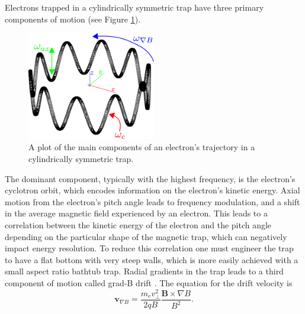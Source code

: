 Electrons trapped in a cylindrically symmetric trap have three primary components of motion (see Figure \ref{fig:chap3-trapped-electron-motion}).
\begin{figure}[htbp]
    \centering
    \includegraphics[width=0.5\textwidth]{figs/Chapter-3/230511_trapped_motion.png}
    \caption{A plot of the main components of an electron's trajectory in a cylindrically symmetric trap.}
    \label{fig:chap3-trapped-electron-motion}
\end{figure}
The dominant component, typically with the highest frequency, is the electron's cyclotron orbit, which encodes information on the electron's kinetic energy. Axial motion from the electron's pitch angle leads to frequency modulation, and a shift in the average magnetic field experienced by an electron. This leads to a correlation between the kinetic energy of the electron and the pitch angle depending on the particular shape of the magnetic trap, which can negatively impact energy resolution. To reduce this correlation one must engineer the trap to have a flat bottom with very steep walls, which is more easily achieved with a small aspect ratio bathtub trap. Radial gradients in the trap leads to a third component of motion called grad-B drift \cite{jackson_classical_1999}. The equation for the drift velocity is
\begin{equation}
    \mathbf{v}_{\nabla B} = \frac{m_e v_\perp^2}{2qB}\frac{\mathbf{B}\times\nabla B}{B^2}.
\end{equation}


